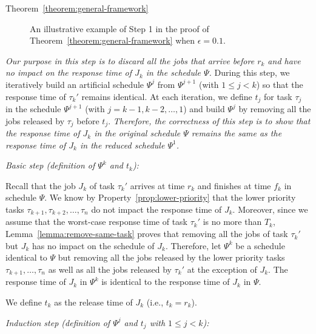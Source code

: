 \begin{appProof}{Theorem~\ref{theorem:general-framework}}


\begin{figure*}[t]
  \centering
\caption{An illustrative example of Step 1 in the proof of Theorem~\ref{theorem:general-framework} when $\epsilon = 0.1$.}
\label{fig:example}  
\end{figure*}



\emph{Our purpose in this step is to discard all the jobs that arrive before $r_k$ and have no impact on the response time of $J_k$ in the schedule
  $\Psi$. } During this step, we iteratively build an artificial schedule $\Psi^j$ from $\Psi^{j+1}$ (with $1 \leq j < k$) so that the response time of $\tau_{k}'$ remains identical. At each iteration, we define $t_j$ for task $\tau_j$ in the schedule $\Psi^{j+1}$ (with $j=k-1, k-2, \ldots, 1$) and build $\Psi^j$ by removing all the jobs released by $\tau_j$ before $t_j$. \emph{Therefore, the correctness of this step is to show that the response time of $J_k$ in the original schedule $\Psi$ remains the same as the response time of $J_k$ in  the reduced schedule $\Psi^1$.}


\noindent\textit{Basic step (definition of $\Psi^k$ and $t_k$):} 

Recall that the job $J_{k}$ of task $\tau_k'$ arrives at time $r_k$ and finishes at time $f_k$ in schedule $\Psi$. We know by Property~\ref{prop:lower-priority} that the lower priority tasks $\tau_{k+1}, \tau_{k+2}, \ldots, \tau_n$ do not impact the response time of $J_{k}$. Moreover, since we assume that the worst-case response time of task $\tau_k'$ is no more than $T_k$, Lemma~\ref{lemma:remove-same-task} proves that removing all the jobs of task $\tau_k'$ but $J_{k}$ has no impact on the schedule of $J_{k}$. Therefore, let $\Psi^k$ be a schedule identical to $\Psi$ but removing all the jobs released by the lower priority tasks $\tau_{k+1}, \ldots, \tau_n$ as well as all the jobs released by $\tau_k'$ at the exception of $J_{k}$. The response time of $J_{k}$ in $\Psi^{k}$ is identical to the response time of $J_{k}$ in $\Psi$.

We define $t_k$ as the release time of $J_k$ (i.e., $t_k = r_k$).


\noindent\textit{Induction step (definition of $\Psi^j$ and $t_j$ with $1 \leq j < k$):}


\end{appProof}
